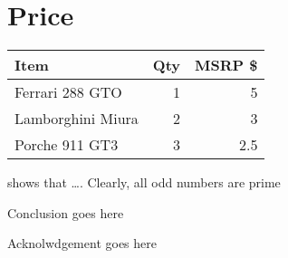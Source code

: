 \documentclass{article}
\begin{document}
\section {Price}

\begin{tabular}{|l|r|r|} \hline%
Item                       & Qty      &     MSRP \$ \\\hline
Ferrari 288 GTO      & 1         &      5     \\\hline

Lamborghini Miura   &2          &      3      \\

Porche 911 GT3       &3          &      2.5    \\\hline
\end{tabular}
\cite{Brooks1997Methodology}
shows that \ldots. Clearly,
all odd numbers are prime


Conclusion goes here


Acknolwdgement goes here



\end{document}

